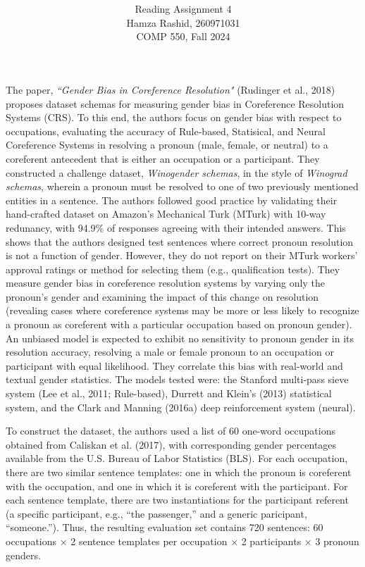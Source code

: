\documentclass[11pt]{article}
\title{ }
\author{ Reading Assignment 4 \\ Hamza Rashid, 260971031 \\ COMP 550, Fall 2024}
\date{}
\begin{document}
\maketitle

\vspace{-4ex}
The paper, \textit{``Gender Bias in Coreference Resolution"} 
(Rudinger et al., 2018) proposes dataset schemas for measuring 
gender bias in Coreference Resolution Systems (CRS). To this end, 
the authors focus on gender bias with respect to occupations, 
evaluating the accuracy of Rule-based, Statisical, and Neural 
Coreference Systems in resolving a pronoun (male, female, or neutral) 
to a coreferent antecedent that is either an occupation or a participant. 
They constructed a challenge dataset, \textit{Winogender schemas}, 
in the style of \textit{Winograd schemas}, wherein a pronoun must be resolved to one of two previously mentioned 
entities in a sentence. The authors followed good practice 
by validating their hand-crafted dataset on Amazon's Mechanical Turk (MTurk) with 10-way
redunancy, with 94.9\% of responses agreeing with their intended answers. This shows that
the authors designed test sentences where correct pronoun resolution is not a function of gender. However,
they do not report on their MTurk workers' approval ratings or method for selecting them 
(e.g., qualification tests). They measure gender bias in coreference resolution systems by 
varying only the pronoun's gender and examining the impact of this change on resolution (revealing cases where coreference
systems may be more or less likely to recognize a pronoun as coreferent with a particular occupation
based on pronoun gender). An unbiased model is expected to exhibit no sensitivity to pronoun gender in its resolution accuracy, resolving a male or female 
pronoun to an occupation or participant with equal likelihood. They correlate this bias with
real-world and textual gender statistics. The models tested were:
the Stanford multi-pass sieve system (Lee et al., 2011; Rule-based), Durrett and Klein's (2013) statistical system, 
and the Clark and Manning (2016a) deep reinforcement system (neural).

To construct the dataset, the authors 
used a list of 60 one-word occupations obtained from Caliskan et al. (2017), 
with corresponding gender percentages
available from the U.S. Bureau of Labor Statistics (BLS). For each occupation, there are two similar
sentence templates: one in which the pronoun is
coreferent with the occupation, and one in which
it is coreferent with the participant.
For each sentence template, there are two instantiations for the participant referent (a specific
participant, e.g., “the passenger,” and a generic
paricipant, “someone.”). Thus, the resulting evaluation set contains 720 sentences: 60 occupations × 2 sentence templates per
occupation × 2 participants × 3 pronoun genders.
\end{document}
